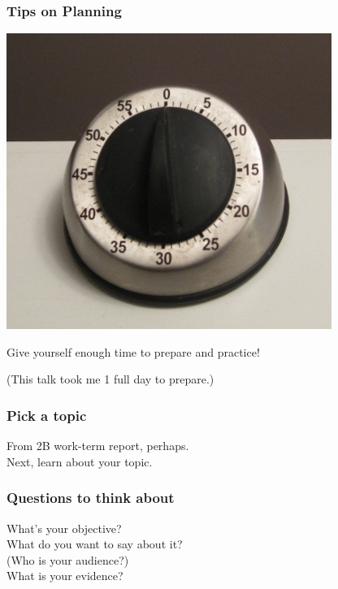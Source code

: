 \documentclass{beamer}
\begin{document}
\begin{frame}

\frametitle{Tips on Planning}

\begin{center}
\includegraphics[scale=0.25]{time}
\end{center}

Give yourself enough time to prepare and practice!

(This talk took me 1 full day to prepare.)

\end{frame}

\begin{frame}

\frametitle{Pick a topic}

\Large
From 2B work-term report, perhaps.\\[2em]

Next, learn about your topic.

\end{frame}

\begin{frame}

\frametitle{Questions to think about}

What's your objective?\\[1em]

What do you want to say about it?\\[1em]

(Who is your audience?)\\[1em]

What is your evidence?

\end{frame}
\end{document}
